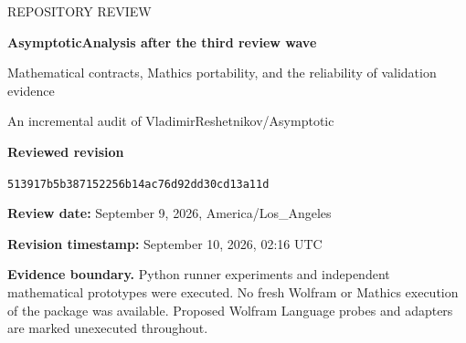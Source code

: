 \documentclass[11pt,letterpaper]{article}
\begin{document}
\begin{titlepage}
\vspace*{0.55in}
{\large REPOSITORY REVIEW\par}
\vspace{0.22in}
{\Huge\bfseries AsymptoticAnalysis after the third review wave\par}
\vspace{0.22in}
{\Large Mathematical contracts, Mathics portability, and the reliability of validation evidence\par}
\vspace{0.45in}
{\large An incremental audit of VladimirReshetnikov/Asymptotic\par}
\vspace{0.15in}
\textbf{Reviewed revision}\par
\nolinkurl{513917b5b387152256b14ac76d92dd30cd13a11d}\par
\textbf{Review date:} September 9, 2026, America/Los\_Angeles\par
\textbf{Revision timestamp:} September 10, 2026, 02:16 UTC\par
\vspace{0.3in}
\begin{abstract}
This review examines the repository after its third intake of external code reviews and the introduction of substantial Mathics-specific compatibility machinery. Its principal new executable results concern the portable validation runner: an observed source change can be forgotten after restoration, and relocated modular sources can escape dependency monitoring. Both mechanisms are reproduced against the pinned upstream Python runner, with a deliberately synthetic kernel protocol; they are not claimed as Wolfram or Mathics package runs. A small patch is tested for the first defect.

The review also traces a remaining lower-Lambert-branch evaluation risk, identifies sparse-to-dense work in a Mathics algebra adapter, and characterizes a private limit-direction mismatch. Their evidence is explicitly distinguished from public-runtime reproduction. Constructive artifacts include immutable Git-source staging, exact rational enclosures for the increasing inverse of $e^x/x$, and hypergeometric Taylor models with negative nonintegral denominator parameters and proved tail bounds. The package is compared fairly with \texttt{Series}, \texttt{InverseSeries}, \texttt{Asymptotic}, \texttt{AsymptoticSolve}, and \texttt{DiscreteAsymptotic}. Existing review findings are used as the baseline rather than republished as discoveries.
\end{abstract}
\vfill
\textbf{Evidence boundary.} Python runner experiments and independent mathematical prototypes were executed. No fresh Wolfram or Mathics execution of the package was available. Proposed Wolfram Language probes and adapters are marked unexecuted throughout.
\end{titlepage}
\tableofcontents
\newpage
\end{document}
